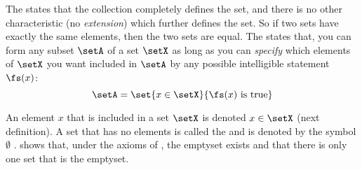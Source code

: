 \begin{definition}
\label{def:set}
\label{def:naive}
\end{definition}

The  states that
the collection completely defines the set,
and there is no other characteristic (no {\em extension})
which further defines the set.
So if two sets have exactly the same elements,
then the two sets are equal.
The  states that,
you can form any subset $\setA$ of a set $\setX$ as long as 
you can \emph{specify} which elements of $\setX$ you want included in $\setA$ 
by any possible intelligible statement $\fs(x)$:
  \[ \setA = \set{x\in\setX}{\fs(x) \text{ is true}} \]

An element $x$ that is included in a set $\setX$ is denoted $x\in\setX$ 
(next definition). 
A set that has no elements is called the  
and is denoted by the symbol $\emptyset$ .
 shows that, under the axioms of ,
the emptyset exists and that there is 
only one set that is the emptyset.
\begin{definition}
\label{def:set_in}
\end{definition}



